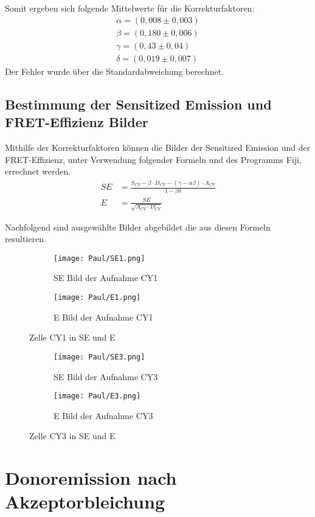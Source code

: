 Somit ergeben sich folgende Mittelwerte für die Korrekturfaktoren: 
\begin{align}
    \alpha = (0,008 \pm 0,003)\\
    \beta = (0,180 \pm 0,006)\\
    \gamma = (0,43 \pm 0,04)\\
    \delta = (0,019 \pm 0,007)
\end{align}
Der Fehler wurde über die Standardabweichung berechnet.

\newpage
\subsection{Bestimmung der Sensitized Emission und FRET-Effizienz Bilder}

Mithilfe der Korrekturfaktoren können die Bilder der Sensitized Emission und der FRET-Effizienz, unter Verwendung folgender Formeln und des Programms Fiji, errechnet werden.
\begin{align}
    SE &= \frac{S_{CY} - \beta \cdot D_{CY} - (\gamma -\alpha \beta)\cdot A_{CY}}{1 - \beta \delta} \\
    E &= \frac{SE}{\sqrt{A_{CY} \cdot D_{CY}}}
\end{align}

Nachfolgend sind ausgewählte Bilder abgebildet die aus diesen Formeln resultieren.

\begin{figure}[h]
    \centering
    \begin{subfigure}[]{0.45\textwidth}
        \centering
        \texttt{[image: Paul/SE1.png]}
        \caption{SE Bild der Aufnahme CY1}
    \end{subfigure}
    \hfill 
    \begin{subfigure}[]{0.45\textwidth}
        \centering
        \texttt{[image: Paul/E1.png]}
        \caption{E Bild der Aufnahme CY1}
    \end{subfigure}
    \caption{Zelle CY1 in SE und E}
\end{figure}

\begin{figure}[h]
    \centering
    \begin{subfigure}[]{0.45\textwidth}
        \centering
        \texttt{[image: Paul/SE3.png]}
        \caption{SE Bild der Aufnahme CY3}
    \end{subfigure}
    \hfill 
    \begin{subfigure}[]{0.45\textwidth}
        \centering
        \texttt{[image: Paul/E3.png]}
        \caption{E Bild der Aufnahme CY3}
    \end{subfigure}
    \caption{Zelle CY3 in SE und E}
\end{figure}

\newpage
\section{Donoremission nach Akzeptorbleichung}
